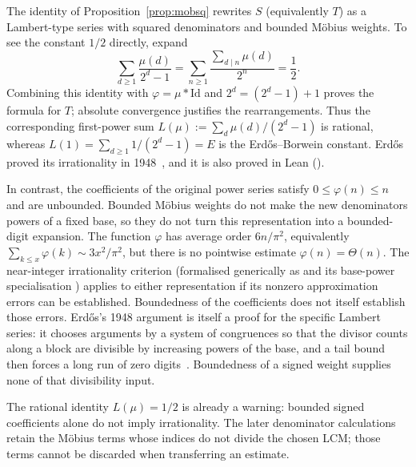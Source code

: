 \begin{rem}
The identity of Proposition~\ref{prop:mobsq} rewrites $S$ (equivalently $T$)
as a Lambert-type series with squared denominators and bounded
M\"obius weights. To see the constant $1/2$ directly, expand
\[
 \sum_{d\ge1}\frac{\mu(d)}{2^d-1}
   =\sum_{n\ge1}\frac{\sum_{d\mid n}\mu(d)}{2^n}=\frac12.
\]
Combining this identity with $\varphi=\mu*\mathrm{Id}$ and
$2^d=(2^d-1)+1$ proves the formula for $T$; absolute convergence
justifies the rearrangements. Thus the corresponding first-power sum
$L(\mu):=\sum_d\mu(d)/(2^d-1)$ is rational, whereas
$L(1)=\sum_{d\ge1}1/(2^d-1)=E$ is the Erd\H{o}s--Borwein constant.
Erd\H{o}s proved its irrationality in 1948~\cite{erdos1948lambert}, and
it is also proved in Lean
().

\par\medskip

In contrast, the coefficients of the original power series satisfy
$0\le\varphi(n)\le n$ and are unbounded. Bounded M\"obius weights do
not make the new denominators powers of a fixed base, so they do not
turn this representation into a bounded-digit expansion.  The function $\varphi$ has average
order $6n/\pi^2$, equivalently
$\sum_{k\le x}\varphi(k)\sim 3x^2/\pi^2$, but there is no pointwise estimate
$\varphi(n)=\Theta(n)$. The near-integer irrationality criterion
(formalised generically as
 and its
base-power specialisation
) applies
to either representation if its nonzero approximation
errors can be established. Boundedness of the coefficients does not itself
establish those errors.
Erd\H{o}s's 1948 argument is itself a proof for the specific Lambert series:
it chooses arguments by a system of congruences so that the divisor counts
along a block are divisible by increasing powers of the base, and a tail bound
then forces a long run of zero digits~\cite[pp.~63--66]{erdos1948lambert}.
Boundedness of a signed weight supplies none of that divisibility input.

\par\medskip

The rational identity $L(\mu)=1/2$ is already a warning: bounded signed
coefficients alone do not imply irrationality. The later denominator
calculations retain the M\"obius terms whose indices do not divide the
chosen LCM; those terms cannot be discarded when transferring an estimate.
\end{rem}

